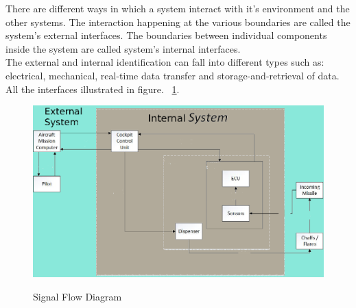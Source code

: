 There are different ways in which a system interact with it's environment and the other systems. The interaction happening at the various boundaries are called the system's external interfaces. The boundaries between individual components inside the system are called system's internal interfaces.\\
The external and internal identification can fall into different types such as: electrical, mechanical, real-time data transfer and storage-and-retrieval of data. All the interfaces illustrated in figure. ~\ref{fig:sigFlowDiagram}.
\begin{figure}[h]
	\centering
	\includegraphics[scale=0.5]{./images/SignalFlowDiagramDDD}\\
	\caption{Signal Flow Diagram}
    \label{fig:sigFlowDiagram}
\end{figure}

